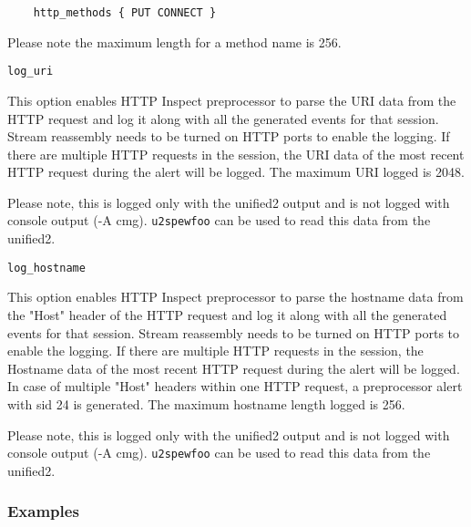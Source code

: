 \documentclass[english]{report}
\newcounter{slistnum}
\newenvironment{slist}
{ \begin{list}{ {\bf \arabic{slistnum}.} }{\usecounter{slistnum} } }
{ \end{list} }
\newenvironment{note}{
\samepage
    \vspace{10pt}{\textsf{
        {\hspace{7pt}\Huge{$\triangle$\hspace{-12.5pt}{\Large{$^!$}}}}\hspace{5pt}
        {\Large{NOTE}}
    }
    }
   \begin{center}
    \par\vspace{-17pt}

    \begin{lrbox}{\savepar}
    \begin{minipage}[r]{6in}
}
{
    \end{minipage}
    \end{lrbox}
    \fbox{
        \usebox{
            \savepar
	}
    }
    \par\vskip10pt
    \end{center}
}
\newenvironment{note}{
        \begin{rawhtml}
        <p><table border="1"><tr><td><b>
        Note:&nbsp;&nbsp;</b>
        \end{rawhtml}
}{
        \begin{rawhtml}
        </b></td></tr></table></p>
        \end{rawhtml}
}
\begin{document}
\begin{slist}
\begin{verbatim}
    http_methods { PUT CONNECT }
\end{verbatim}

\begin{note}

Please note the maximum length for a method name is 256.

\end{note}

\item \texttt{log\_uri}

This option enables HTTP Inspect preprocessor to parse the URI data from the
HTTP request and log it along with all the generated events for that session.
Stream reassembly needs to be turned on HTTP ports to enable the logging.
If there are multiple HTTP requests in the session, the URI data of the most recent
HTTP request during the alert will be logged. The maximum URI logged is 2048.

\begin{note}

Please note, this is logged only with the unified2 output and is not logged
with console output (-A cmg). \texttt{u2spewfoo} can be used to read this data from
the unified2.

\end{note}

\item \texttt{log\_hostname}

This option enables HTTP Inspect preprocessor to parse the hostname data from the
"Host" header of the HTTP request and log it along with all the generated events
for that session. Stream reassembly needs to be turned on HTTP ports to enable
the logging. If there are multiple HTTP requests in the session, the Hostname data
of the most recent HTTP request during the alert will be logged. In case of
multiple "Host" headers within one HTTP request, a preprocessor alert with sid 24 is
generated. The maximum hostname length logged is 256.

\begin{note}

Please note, this is logged only with the unified2 output and is not logged
with console output (-A cmg). \texttt{u2spewfoo} can be used to read this data from
the unified2.

\end{note}

\end{slist}

\subsubsection{Examples}
\end{document}
